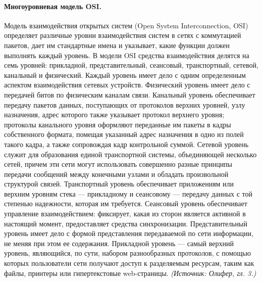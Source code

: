 \documentclass[a4paper,12pt]{article}
\begin{document}
\paragraph{Многоуровневая модель OSI.}
Модель взаимодействия открытых систем (Open System Interconnection, OSI) определяет различные уровни взаимодействия систем в сетях с коммутацией пакетов, дает им стандартные имена и указывает, какие функции должен выполнять каждый уровень. В модели OSI средства взаимодействия делятся на семь уровней: прикладной, представительный, сеансовый, транспортный, сетевой, канальный и физический. Каждый уровень имеет дело с одним определенным аспектом взаимодействия сетевых устройств. Физический уровень имеет дело с передачей битов по физическим каналам связи. Канальный уровень обеспечивает передачу пакетов данных, поступающих от протоколов верхних уровней, узлу назначения, адрес которого также указывает протокол верхнего уровня; протоколы канального уровня оформляют переданные им пакеты в кадры собственного формата, помещая указанный адрес назначения в одно из полей такого кадра, а также сопровождая кадр контрольной суммой. Сетевой уровень служит для образования единой транспортной системы, объединяющей несколько сетей, причем эти сети могут использовать совершенно разные принципы передачи сообщений между конечными узлами и обладать произвольной структурой связей. Транспортный уровень обеспечивает приложениям или верхним уровням стека — прикладному и сеансовому — передачу данных с той степенью надежности, которая им требуется. Сеансовый уровень обеспечивает управление взаимодействием: фиксирует, какая из сторон является активной в настоящий момент, предоставляет средства синхронизации. Представительный уровень имеет дело с формой представления передаваемой по сети информации, не меняя при этом ее содержания. Прикладной уровень — самый верхний уровень, являющийся, по сути, набором разнообразных протоколов, с помощью которых пользователи сети получают доступ к разделяемым ресурсам, таким как файлы, принтеры или гипертекстовые web-страницы.
\textit{(Источник: Олифер, гл. 3.)}
\end{document}

